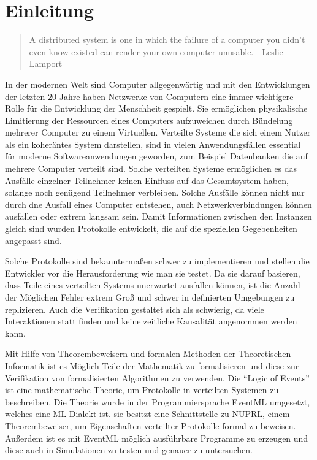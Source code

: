 
\section{Einleitung}
\label{sec_1}


\begin{quote}
A distributed system is one in which the failure of a computer you didn't even
know existed can render your own computer unusable. - Leslie Lamport
\end{quote}

In der modernen Welt sind Computer allgegenwärtig und mit den Entwicklungen
der letzten 20 Jahre haben Netzwerke von Computern eine immer wichtigere Rolle
für die Entwicklung der Menschheit gespielt. Sie ermöglichen physikalische
Limitierung der Ressourcen eines Computers aufzuweichen durch Bündelung
mehrerer Computer zu einem Virtuellen. Verteilte Systeme die sich einem Nutzer
als ein koheräntes System darstellen, sind in vielen Anwendungsfällen essential
für moderne Softwareanwendungen geworden, zum Beispiel Datenbanken die
auf mehrere Computer verteilt sind. Solche verteilten Systeme ermöglichen
es das Ausfälle einzelner Teilnehmer keinen Einfluss auf das Gesamtsystem haben,
solange noch genügend Teilnehmer verbleiben. Solche Ausfälle können nicht nur
durch dne Ausfall eines Computer entstehen, auch Netzwerkverbindungen können
ausfallen oder extrem langsam sein. Damit Informationen zwischen den
Instanzen gleich sind wurden Protokolle entwickelt, die auf die speziellen
Gegebenheiten angepasst sind.

Solche Protokolle sind bekanntermaßen schwer zu implementieren und stellen
die Entwickler vor die Herausforderung wie man sie testet. Da sie darauf
basieren, dass Teile eines verteilten Systems unerwartet ausfallen können,
ist die Anzahl der Möglichen Fehler extrem Groß und schwer in definierten
Umgebungen zu replizieren. Auch die Verifikation gestaltet sich als
schwierig, da viele Interaktionen statt finden und keine zeitliche
Kausalität angenommen werden kann.

Mit Hilfe von Theorembeweisern und formalen Methoden der Theoretischen
Informatik ist es Möglich Teile der Mathematik zu formalisieren und
diese zur Verifikation von formalisierten Algorithmen zu verwenden.
Die ``Logic of Events'' ist eine mathematische Theorie, um Protokolle
in verteilten Systemen zu beschreiben.
Die Theorie wurde in der Programmiersprache EventML umgesetzt, welches eine
ML-Dialekt ist. sie besitzt eine Schnittstelle zu NUPRL, einem Theorembeweiser,
um Eigenschaften verteilter Protokolle formal zu beweisen.
Außerdem ist es mit EventML möglich ausführbare Programme zu erzeugen und
diese auch in Simulationen zu testen und genauer zu untersuchen.

